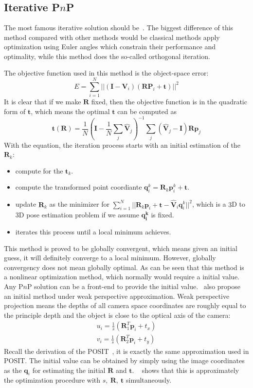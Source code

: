 \documentclass[a4paper]{article}
\begin{document}
\subsection{Iterative P$n$P}
The most famous iterative solution should be~\cite{lu2000fast}. The biggest difference of this method compared with other methods would be classical methods apply optimization using Euler angles which constrain their performance and optimality, while this method does the so-called orthogonal iteration. 

The objective function used in this method is the object-space error:
$$
E = \sum_{i=1}^{N} ||(\mathbf{I}-\mathbf{V}_i)(\mathbf{R}\mathbf{P}_i+\mathbf{t})||^2
$$
It is clear that if we make $\mathbf{R}$ fixed, then the objective function is in the quadratic form of $\mathbf{t}$, which means the optimal $\mathbf{t}$ can be computed as
$$
\mathbf{t}(\mathbf{R})=\frac{1}{N}(\mathbf{I}-\frac{1}{N}\sum_{j}\hat{\mathbf{V}}_j)^{-1} \sum_{j}(\hat{\mathbf{V}}_j-\mathbf{I})\mathbf{R}\mathbf{p}_j
$$
With the equation, the iteration process starts with an initial estimation of the $\mathbf{R}_k$:
\begin{itemize}
	\item compute for the $\mathbf{t}_k$.
	\item compute the transformed point coordiante $\mathbf{q}^k_i=\mathbf{R}_k\mathbf{p}^k_i+\mathbf{t}$.
	\item update $\mathbf{R}_k$ as the minimizer for $\sum_{i=1}^{N}||\mathbf{R}_k\mathbf{p}_i+\mathbf{t}-\hat{\mathbf{V}}_i\mathbf{q}^k_i||^2$, which is a $3$D to $3$D pose estimation problem if we assume $\mathbf{q_i^k}$ is fixed.
	\item iterates this process until a local minimum achieves.
\end{itemize}
This method is proved to be globally convergent, which means given an initial guess, it will definitely converge to a local minimum. However, globally convergency does not mean globally optimal. As can be seen that this method is a nonlinear optimization method, which normally would require a initial value. Any P$n$P solution can be a front-end to provide the initial value.~\cite{lu2000fast} also propose an initial method under weak perspective approximation. Weak perspective projection means the depths of all camera space coordinates are roughly equal to the principle depth and the object is close to the optical axis of the camera:
\begin{align*}
u_i = \frac{1}{s}(\mathbf{R}_1^T\mathbf{p}_i+t_x) \\
v_i = \frac{1}{s}(\mathbf{R}_2^T\mathbf{p}_i+t_y)
\end{align*}
Recall the derivation of the POSIT~\cite{oberkampf1996iterative}, it is exactly the same approximation used in POSIT. The initial value can be obtained by simply using the image coordinates as the $\mathbf{q}_i$ for estimating the initial $\mathbf{R}$ and $\mathbf{t}$. ~\cite{lu2000fast} shows that this is approximately the optimization procedure with $s,\ \mathbf{R},\ \mathbf{t}$ simultaneously.



 

\end{document}
